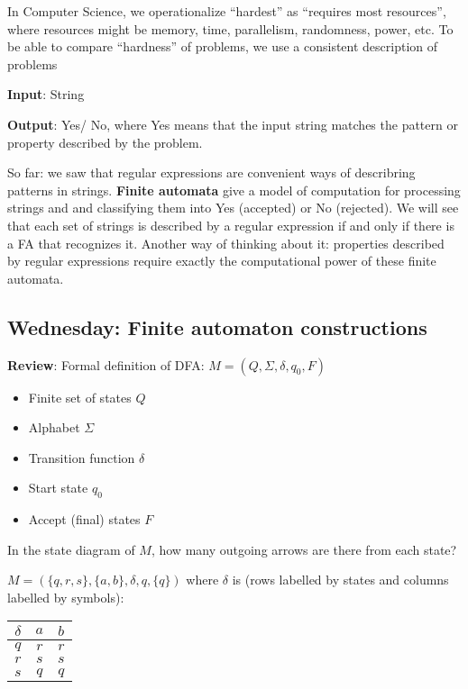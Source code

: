 \documentclass[12pt, oneside]{article}
\begin{document}
\begin{flushright}
\end{flushright} 

In Computer Science, we operationalize ``hardest'' as ``requires most resources'', where
resources might be memory, time, parallelism, randomness, power, etc.
To be able to compare ``hardness'' of problems, we use a consistent description of problems

{\bf Input}: String

{\bf Output}: Yes/ No, where Yes means that the input string matches the pattern or property described by the problem.

So far: we saw that regular expressions are convenient ways of describring patterns in strings.
{\bf Finite automata} give a model of computation for processing strings and and classifying them into Yes (accepted)
or No (rejected). We will see that each set of strings is described by a regular expression if and only 
if there is a FA that recognizes it.  Another way of thinking about it: properties described by regular
expressions require exactly the computational power of these finite automata.


\subsection*{Wednesday: Finite automaton constructions}






{\bf Review}: Formal definition of DFA: $M = (Q, \Sigma, \delta, q_0, F)$ 

\begin{center}
\begin{multicols}{2}
\begin{itemize}
\setlength{\itemsep}{2pt}
\item Finite set of states $Q$
\item Alphabet $\Sigma$
\item Transition function $\delta$
\item Start state $q_0$
\item Accept (final) states $F$
\end{itemize}
\end{multicols}
\end{center}
In the state diagram of $M$, how many outgoing arrows are there from each state?

$M = ( \{ q, r, s\}, \{a,b\}, \delta, q, \{q\} )$ 
where $\delta$ is  (rows labelled by states
and columns labelled by symbols):
\begin{center}
\begin{tabular}{c|cc}
$\delta$ & $a$ & $b$ \\
\hline
$q$ & $r$ & $r$ \\
$r$ & $s$ & $s$ \\
$s$ & $q$ & $q$ \\
\end{tabular}
\end{center}
\end{document}
